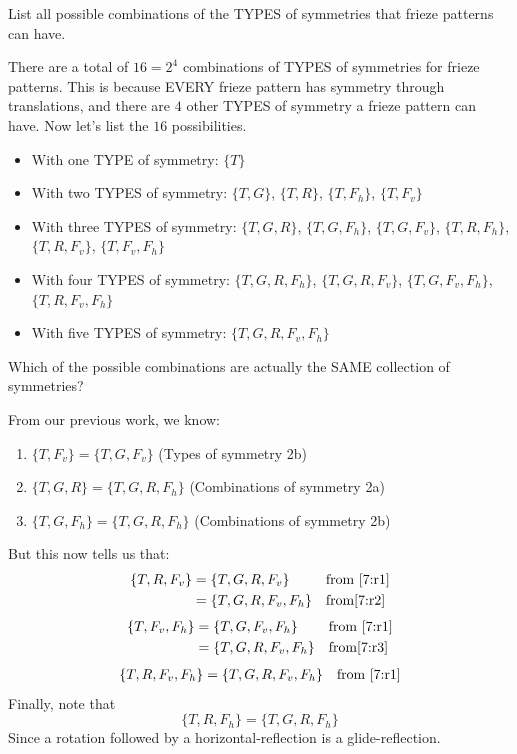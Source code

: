 \documentclass[noauthor,nooutcomes,12pt,hints]{ximera}
\begin{document}
\mynewpage


\begin{question}
  List all possible combinations of the TYPES of symmetries that
  frieze patterns can have.
  \begin{freeResponse}
    There are a total of $16 = 2^4$ combinations of TYPES of
    symmetries for frieze patterns. This is because EVERY frieze
    pattern has symmetry through translations, and there are $4$ other
    TYPES of symmetry a frieze pattern can have.  Now let's list the
    $16$ possibilities.
    \begin{itemize}
    \item With one TYPE of symmetry: $\{T\}$
    \item With two TYPES of symmetry: $\{T,G\}$, $\{T,R\}$, $\{T,F_h\}$, $\{T,F_v\}$
    \item With three TYPES of symmetry: $\{T,G,R\}$, $\{T,G,F_h\}$, $\{T,G,F_v\}$, $\{T,R,F_h\}$, $\{T,R,F_v\}$, $\{T,F_v,F_h\}$
    \item With four TYPES of symmetry:  $\{T,G,R,F_h\}$, $\{T,G,R,F_v\}$, $\{T,G,F_v,F_h\}$, $\{T,R,F_v,F_h\}$
    \item With five TYPES of symmetry: $\{T,G,R,F_v,F_h\}$
    \end{itemize}
  \end{freeResponse}
\end{question}
\mynewpage

\begin{question}
  Which of the possible combinations are actually the SAME collection
  of symmetries?
  \begin{freeResponse}
    From our previous work, we know:
    \begin{enumerate}
    \item\label{7:r1} $\{T,F_v\} = \{T,G,F_v\}$ (Types of symmetry 2b)
    \item\label{7:r2} $\{T,G,R\} = \{T,G,R,F_h\}$ (Combinations of symmetry 2a)
    \item\label{7:r3} $\{T,G,F_h\} = \{T,G,R,F_h\}$ (Combinations of symmetry 2b)
    \end{enumerate}
    But this now tells us that:
    \begin{align*}
      \{T,R,F_v\} &= \{T,G,R,F_v\} & &\text{from \ref{7:r1}}\\
      &= \{T,G,R,F_v,F_h\} & &\text{from\ref{7:r2}}
    \end{align*}
    \begin{align*}
      \{T,F_v,F_h\} &= \{T,G,F_v,F_h\}& &\text{from \ref{7:r1}} \\
      &= \{T,G,R,F_v,F_h\} & &\text{from\ref{7:r3}}
    \end{align*}
    \begin{align*}
      \{T,R,F_v,F_h\} &= \{T,G,R,F_v,F_h\} & &\text{from \ref{7:r1}}\\
    \end{align*}
    Finally, note that
    \[
    \{T,R,F_h\} = \{T,G,R,F_h\}
    \]
    Since a rotation followed by a horizontal-reflection is a
    glide-reflection.
  \end{freeResponse}
\end{question}
\mynewpage
\end{document}
